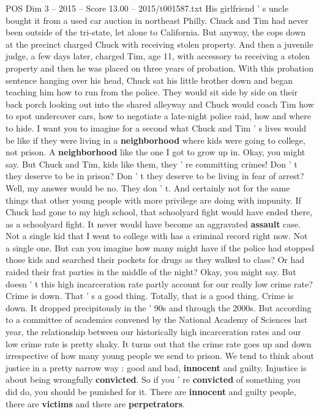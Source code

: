 \begin{textsample}{POS Dim 3 – 2015 – Score 13.00 – 2015/t001587.txt}
His girlfriend ' s uncle bought it from a used car auction in northeast Philly.
Chuck and Tim had never been outside of the tri-state, let alone to California.
But anyway, the cops down at the precinct charged Chuck with receiving stolen property.
And then a juvenile judge, a few days later, charged Tim, age 11, with accessory to receiving a stolen property and then he was placed on three years of probation.
With this probation sentence hanging over his head, Chuck sat his little brother down and began teaching him how to run from the police.
They would sit side by side on their back porch looking out into the shared alleyway and Chuck would coach Tim how to spot undercover cars, how to negotiate a late-night police raid, how and where to hide.
I want you to imagine for a second what Chuck and Tim ' s lives would be like if they were living in a \textbf{neighborhood} where kids were going to college, not prison.
A \textbf{neighborhood} like the one I got to grow up in.
Okay, you might say.
But Chuck and Tim, kids like them, they ' re committing crimes!
Don ' t they deserve to be in prison?
Don ' t they deserve to be living in fear of arrest?
Well, my answer would be no.
They don ' t.
And certainly not for the same things that other young people with more privilege are doing with impunity.
If Chuck had gone to my high school, that schoolyard fight would have ended there, as a schoolyard fight.
It never would have become an aggravated \textbf{assault} case.
Not a single kid that I went to college with has a criminal record right now.
Not a single one.
But can you imagine how many might have if the police had stopped those kids and searched their pockets for drugs as they walked to class?
Or had raided their frat parties in the middle of the night?
Okay, you might say.
But doesn ' t this high incarceration rate partly account for our really low crime rate?
Crime is down.
That ' s a good thing.
Totally, that is a good thing.
Crime is down.
It dropped precipitously in the ' 90s and through the 2000s.
But according to a committee of academics convened by the National Academy of Sciences last year, the relationship between our historically high incarceration rates and our low crime rate is pretty shaky.
It turns out that the crime rate goes up and down irrespective of how many young people we send to prison.
We tend to think about justice in a pretty narrow way : good and bad, \textbf{innocent} and guilty.
Injustice is about being wrongfully \textbf{convicted}.
So if you ' re \textbf{convicted} of something you did do, you should be punished for it.
There are \textbf{innocent} and guilty people, there are \textbf{victims} and there are \textbf{perpetrators}.

\end{textsample}
